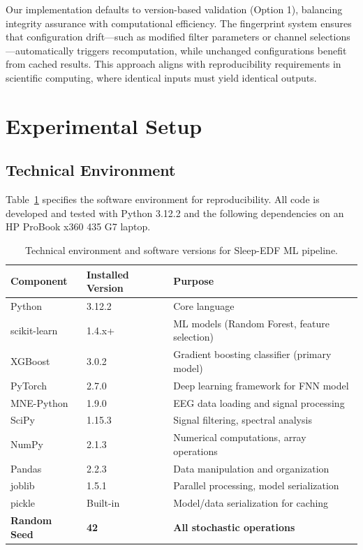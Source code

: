 \documentclass{imc-inf} %
\begin{document}
Our implementation defaults to version-based validation (Option 1), balancing integrity assurance with computational efficiency. The fingerprint system ensures that configuration drift---such as modified filter parameters or channel selections---automatically triggers recomputation, while unchanged configurations benefit from cached results. This approach aligns with reproducibility requirements in scientific computing, where identical inputs must yield identical outputs.



\section{Experimental Setup}
\label{sec:experiment_setup}

\subsection{Technical Environment}

Table~\ref{tab:technical_env} specifies the software environment for reproducibility. All code is developed and tested with Python 3.12.2 and the following dependencies on an HP ProBook x360 435 G7 laptop.

\begin{table}[ht]
\centering
\begin{tabular}{|l|l|l|}
\hline
\textbf{Component} & \textbf{Installed Version} & \textbf{Purpose} \\
\hline
Python & 3.12.2 & Core language \\
\hline
scikit-learn & 1.4.x+ & ML models (Random Forest, feature selection) \\
\hline
XGBoost & 3.0.2 & Gradient boosting classifier (primary model) \\
\hline
PyTorch & 2.7.0 & Deep learning framework for FNN model \\
\hline
MNE-Python & 1.9.0 & EEG data loading and signal processing \\
\hline
SciPy & 1.15.3 & Signal filtering, spectral analysis \\
\hline
NumPy & 2.1.3 & Numerical computations, array operations \\
\hline
Pandas & 2.2.3 & Data manipulation and organization \\
\hline
joblib & 1.5.1 & Parallel processing, model serialization \\
\hline
pickle & Built-in & Model/data serialization for caching \\
\hline
\textbf{Random Seed} & \textbf{42} & \textbf{All stochastic operations} \\
\hline
\end{tabular}
\caption{Technical environment and software versions for Sleep-EDF ML pipeline.}
\label{tab:technical_env}
\end{table}
\end{document}
